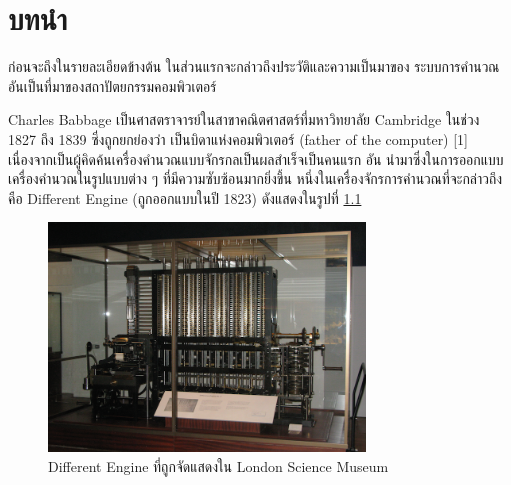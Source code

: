 \chapter{บทนำ}

\par{
ก่อนจะถึงในรายละเอียดข้างต้น 
ในส่วนแรกจะกล่าวถึงประวัติและความเป็นมาของ
ระบบการคำนวณอันเป็นที่มาของสถาปัตยกรรมคอมพิวเตอร์
}

\par{
Charles Babbage เป็นศาสตราจารย์ในสาขาคณิตศาสตร์ที่มหาวิทยาลัย 
Cambridge ในช่วง 1827 ถึง 1839 ซึ่งถูกยกย่องว่า
เป็นบิดาแห่งคอมพิวเตอร์ (father of the computer) [1] 
เนื่องจากเป็นผู้คิดค้นเครื่องคำนวณแบบจักรกลเป็นผลสำเร็จเป็นคนแรก อัน
นำมาซึ่งในการออกแบบเครื่องคำนวณในรูปแบบต่าง ๆ ที่มีความซับซ้อนมากยิ่งขึ้น 
หนึ่งในเครื่องจักรการคำนวณที่จะกล่าวถึงคือ Different Engine 
(ถูกออกแบบในปี 1823) ดังแสดงในรูปที่ 
\ref{fig_babbage_difference_engine}
}

\begin{figure}[h]
\centering
\includegraphics[width=0.75\textwidth]{fig/Babbage_Difference_Engine.png}
\caption{Different Engine ที่ถูกจัดแสดงใน London Science Museum}
\label{fig_babbage_difference_engine}
\end{figure}

